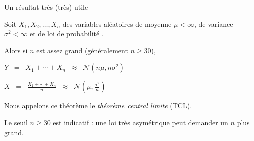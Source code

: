 \documentclass{BeamerTemplate}
\begin{document}
\begin{frame}[t]{Un résultat très (très) utile}
\begin{thm}{}
Soit $X_1, X_2, \ldots, X_n$ des variables aléatoires  de moyenne $\mu<\infty$,
de variance $\sigma^2<\infty$ et de loi de probabilité .

\vspace{0.4cm}
Alors si $n$ est assez grand (généralement $n \geq 30$),

\vspace{0.4cm}
$Y\;\;=\;\;X_1+\cdots+X_n\;\;\approx\;\; \mathcal{N}(n\mu, n\sigma^2)$

\vspace{0.4cm}
$\overline X\;\;=\;\;\displaystyle\frac{X_1+\cdots+X_n}{n}\;\;\approx\;\; \mathcal{N}\left(\mu, \frac{\sigma^2}{n}\right)$
\end{thm}
Nous appelons ce théorème le \textit{théorème central limite} (TCL).

\vspace{0.1cm}
{\small Le seuil $n\ge 30$ est indicatif : une loi très asymétrique peut demander un $n$ plus grand.}
\end{frame}
\end{document}
